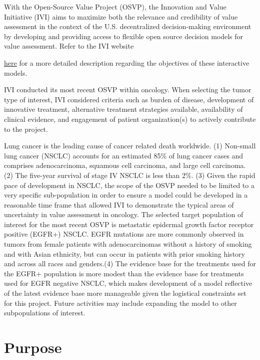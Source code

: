 \documentclass[11pt,final,fleqn]{article}\usepackage[]{graphicx}\usepackage[]{color}
\theoremstyle{plain}
\begin{document}
With the Open-Source Value Project (OSVP), the Innovation and Value Initiative (IVI) aims to maximize both the relevance and credibility of value assessment in the context of the U.S. decentralized decision-making environment by developing and providing access to flexible open source decision models for value assessment. Refer to the IVI website {\href{https://www.thevalueinitiative.org/open-source-value-project/}{here} for a more detailed description regarding the objectives of these interactive models. 

IVI conducted its most recent OSVP within oncology. When selecting the tumor type of interest, IVI considered criteria such as burden of disease, development of innovative treatment, alternative treatment strategies available, availability of clinical evidence, and engagement of patient organization(s) to actively contribute to the project. 

Lung cancer is the leading cause of cancer related death worldwide. (1) Non-small lung cancer (NSCLC) accounts for an estimated 85\% of lung cancer cases and comprises adenocarcinoma, squamous cell carcinoma, and large cell carcinoma. (2) The five-year survival of stage IV NSCLC is less than 2\%. (3) Given the rapid pace of development in NSCLC, the scope of the OSVP needed to be limited to a very specific sub-population in order to ensure a model could be developed in a reasonable time frame that allowed IVI to demonstrate the typical areas of uncertainty in value assessment in oncology. The selected target population of interest for the most recent OSVP is metastatic epidermal growth factor receptor positive (EGFR+) NSCLC. EGFR mutations are more commonly observed in tumors from female patients with adenocarcinomas without a history of smoking and with Asian ethnicity, but can occur in patients with prior smoking history and across all races and genders.(4) The evidence base for the treatments used for the EGFR+ population is more modest than the evidence base for treatments used for EGFR negative NSCLC, which makes development of a model reflective of the latest evidence base more manageable given the logistical constraints set for this project. Future activities may include expanding the model to other subpopulations of interest.

\section{Purpose}\label{sec:purpose}
}
\end{document}

